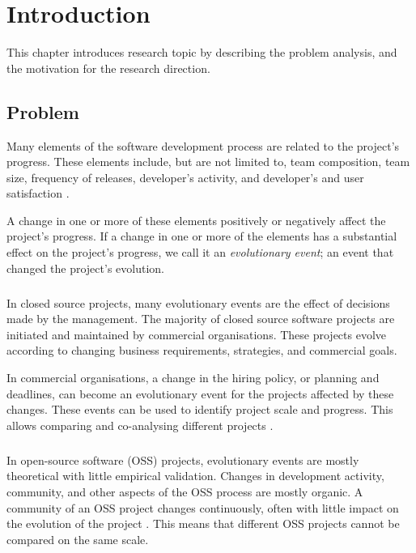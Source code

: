 \chapter{Introduction}
\label{introduction}

This chapter introduces research topic by describing the problem analysis, and
the motivation for the research direction.

\section{Problem}
Many elements of the software development process are related to the project's
progress. These elements include, but are not limited to, team composition,
team size, frequency of releases, developer's activity, and developer's and
user satisfaction \cite{crowston2006, delone1992, samoladas2010}.

A change in one or more of these elements positively or negatively affect the
project's progress. If a change in one or more of the elements has a substantial
effect on the project's progress, we call it an \emph{evolutionary event}\rm; an
event that changed the project's evolution.

\paragraph{}
In closed source projects, many evolutionary events are the effect of decisions
made by the management. The majority of closed source software projects are
initiated and maintained by commercial organisations. These projects evolve
according to changing business requirements, strategies, and commercial goals.

In commercial organisations, a change in the hiring policy, or planning and
deadlines, can become an evolutionary event for the projects affected by these
changes. These events can be used to identify project scale and progress. This
allows comparing and co-analysing different projects \cite{karus2013}.

\paragraph{}
In open-source software (OSS) projects, evolutionary events are mostly
theoretical with little empirical validation. Changes in development activity,
community, and other aspects of the OSS process are mostly organic. A community
of an OSS project changes continuously, often with little impact on the
evolution of the project \cite{androutsellis}. This means that different OSS
projects cannot be compared on the same scale.

